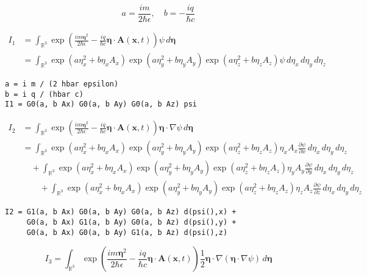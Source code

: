 \begin{equation*}
a=\frac{im}{2\hbar\epsilon},\quad
b=-\frac{iq}{\hbar c}
\end{equation*}

\begin{align*}
I_1&=\int_{\mathbb R^3}
\exp\left(\frac{im\boldsymbol\eta^2}{2\hbar\epsilon}
-\frac{iq}{\hbar c}\boldsymbol\eta\cdot\mathbf A(\mathbf x,t)\right)
\psi\,d\boldsymbol\eta
\\
&=\int_{\mathbb R^3}
\exp\left(a\eta_x^2+b\eta_xA_x\right)
\exp\left(a\eta_y^2+b\eta_yA_y\right)
\exp\left(a\eta_z^2+b\eta_zA_z\right)
\psi\,d\eta_x\,d\eta_y\,d\eta_z
\end{align*}

{\footnotesize\begin{verbatim}
a = i m / (2 hbar epsilon)
b = i q / (hbar c)
I1 = G0(a, b Ax) G0(a, b Ay) G0(a, b Az) psi
\end{verbatim}}

\begin{align*}
I_2&=\int_{\mathbb R^3}
\exp\left(\frac{im\boldsymbol\eta^2}{2\hbar\epsilon}
-\frac{iq}{\hbar c}\boldsymbol\eta\cdot\mathbf A(\mathbf x,t)\right)
\boldsymbol\eta\cdot\nabla\psi
\,d\boldsymbol\eta
\\
&=\int_{\mathbb R^3}
\exp\left(a\eta_x^2+b\eta_xA_x\right)
\exp\left(a\eta_y^2+b\eta_yA_y\right)
\exp\left(a\eta_z^2+b\eta_zA_z\right)\eta_xA_x\frac{\partial\psi}{\partial x}
\,d\eta_x\,d\eta_y\,d\eta_z
\\
&\quad{}+\int_{\mathbb R^3}
\exp\left(a\eta_x^2+b\eta_xA_x\right)
\exp\left(a\eta_y^2+b\eta_yA_y\right)
\exp\left(a\eta_z^2+b\eta_zA_z\right)\eta_yA_y\frac{\partial\psi}{\partial y}
\,d\eta_x\,d\eta_y\,d\eta_z
\\
&\quad\quad{}+\int_{\mathbb R^3}
\exp\left(a\eta_x^2+b\eta_xA_x\right)
\exp\left(a\eta_y^2+b\eta_yA_y\right)
\exp\left(a\eta_z^2+b\eta_zA_z\right)\eta_zA_z\frac{\partial\psi}{\partial z}
\,d\eta_x\,d\eta_y\,d\eta_z
\end{align*}

{\footnotesize\begin{verbatim}
I2 = G1(a, b Ax) G0(a, b Ay) G0(a, b Az) d(psi(),x) +
     G0(a, b Ax) G1(a, b Ay) G0(a, b Az) d(psi(),y) +
     G0(a, b Ax) G0(a, b Ay) G1(a, b Az) d(psi(),z)
\end{verbatim}}

\begin{equation*}
I_3=\int_{\mathbb R^3}
\exp\left(\frac{im\boldsymbol\eta^2}{2\hbar\epsilon}
-\frac{iq}{\hbar c}\boldsymbol\eta\cdot\mathbf A(\mathbf x,t)\right)
\frac{1}{2}\boldsymbol\eta\cdot\nabla(\boldsymbol\eta\cdot\nabla\psi)
\,d\boldsymbol\eta
\end{equation*}


